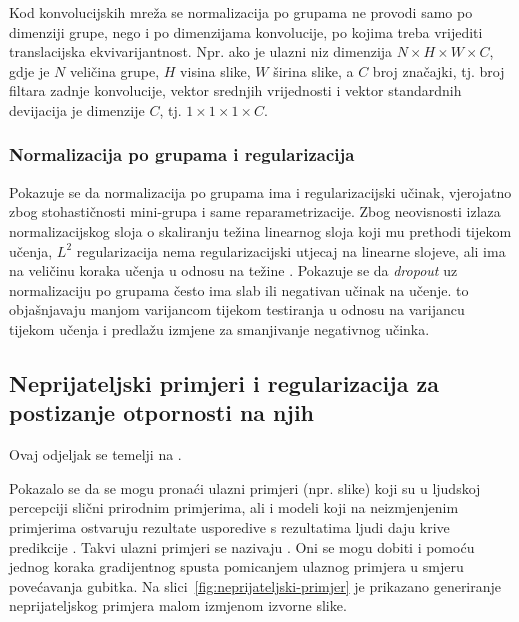 \documentclass[utf8, diplomski, lmodern]{fer}
\begin{document}
Kod konvolucijskih mreža se normalizacija po grupama ne provodi samo po dimenziji grupe, nego i po dimenzijama konvolucije, po kojima treba vrijediti translacijska ekvivarijantnost. Npr. ako je ulazni niz dimenzija $N\times H\times W\times C$, gdje je $N$ veličina grupe, $H$ visina slike, $W$ širina slike, a $C$ broj značajki, tj. broj filtara zadnje konvolucije, vektor srednjih vrijednosti i vektor standardnih devijacija je dimenzije $C$, tj. $1\times 1\times 1\times C$.

\subsubsection{Normalizacija po grupama i regularizacija}

Pokazuje se da normalizacija po grupama ima i regularizacijski učinak, vjerojatno zbog stohastičnosti mini-grupa i same reparametrizacije. Zbog neovisnosti izlaza normalizacijskog sloja o skaliranju težina linearnog sloja koji mu prethodi tijekom učenja, $L^2$ regularizacija nema regularizacijski utjecaj na linearne slojeve, ali ima na veličinu koraka učenja u odnosu na težine \citep{Twan:2017:LRBWN}. Pokazuje se da \textit{dropout} uz normalizaciju po grupama često ima slab ili negativan učinak na učenje. \cite{Xiang:2018:UDBDBNVS} to objašnjavaju manjom varijancom tijekom testiranja u odnosu na varijancu tijekom učenja i predlažu izmjene za smanjivanje negativnog učinka.


\subsection{Neprijateljski primjeri i regularizacija za postizanje otpornosti na njih} \label{subsec:neprijateljski-primjeri}

Ovaj odjeljak se temelji na \cite{Grubisic:2018:IPM}.
 
Pokazalo se da se mogu pronaći ulazni primjeri (npr. slike) koji su u ljudskoj percepciji slični prirodnim primjerima, ali i modeli koji na neizmjenjenim primjerima ostvaruju rezultate usporedive s rezultatima ljudi daju krive predikcije \citep{Szegedy:2013:IPNN,Goodfellow:2014:EHAE}. Takvi ulazni primjeri se nazivaju . Oni se mogu dobiti i pomoću jednog koraka gradijentnog spusta pomicanjem ulaznog primjera u smjeru povećavanja gubitka. Na slici~\ref{fig:neprijateljski-primjer} je prikazano generiranje neprijateljskog primjera malom izmjenom izvorne slike.
\end{document}
